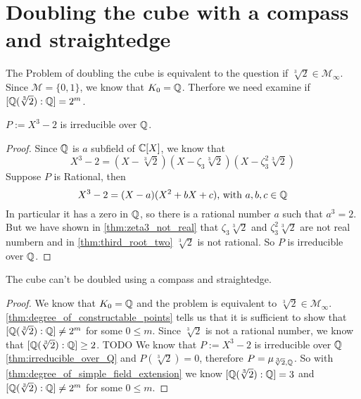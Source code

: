 \documentclass{../Proof_layout_PDF/TemplateExercise}
\begin{document}
\section{Doubling the cube with a compass and straightedge}
The Problem of doubling the cube is equivalent to the question if $\sqrt[3]{2} \in \mathcal{M}_{\infty}$.
Since $\mathcal{M} = \{0,1\}$, we know that $K_0 = \mathbb{Q}$. Therfore we need examine if $[\mathbb{Q}(\sqrt[3]{2}):\mathbb{Q}] = 2^m$.

\begin{theorem}
    $P := X^3 - 2$ is irreducible over $\mathbb{Q}$.
\label{thm:irreducible_over_Q}
\end{theorem}
\begin{proof}
    Since $\mathbb{Q}$ is $a$ subfield of $\mathbb{C} [X]$, we know that
    \begin{equation*}
        X^3 - 2 = (X - \sqrt[3]{2})(X -\zeta_3 \sqrt[3]{2})(X -\zeta_3^2 \sqrt[3]{2})
    \end{equation*}
    Suppose $P$ is Rational, then
    \begin{equation*}
        X^3 - 2 = (X - a)(X^2 + bX + c)\text{, with } a, b, c \in \mathbb{Q}
    \end{equation*}
    In particular it has a zero in $\mathbb{Q}$, so there is a rational number $a$ such that $a^3 = 2$.\newline
    But we have shown in \ref{thm:zeta3_not_real} that $\zeta_3 \sqrt[3]{2}$ and $\zeta_3^2 \sqrt[3]{2}$ are not real numbern and in \ref{thm:third_root_two} $\sqrt[3]{2}$ is not rational.
    So $P$ is irreducible over $\mathbb{Q}$.
\end{proof}
\begin{theorem}
    The cube can't be doubled using a compass and straightedge.
\end{theorem}
\begin{proof}
    We know that $K_0 = \mathbb{Q}$ and the problem is equivalent to $\sqrt[3]{2} \in \mathcal{M}_{\infty}$.\newline
    \ref{thm:degree_of_constructable_points} tells us that it is sufficient to show that $[\mathbb{Q}(\sqrt[3]{2}):\mathbb{Q}] \ne 2^m$ for some $0 \le m $.
    Since $\sqrt[3]{2}$ is not a rational number, we know that $[\mathbb{Q}(\sqrt[3]{2}):\mathbb{Q}] \ge 2$.
    TODO %
    \newline
    We know that $P := X^3 - 2$ is irreducible over $\mathbb{Q}$ \ref{thm:irreducible_over_Q} and $P(\sqrt[3]{2}) = 0$, therefore $P = \mu_{\sqrt[3]{2},\mathbb{Q}}$.
    So with \ref{thm:degree_of_simple_field_extension} we know $[\mathbb{Q}(\sqrt[3]{2}):\mathbb{Q}] = 3$ and $[\mathbb{Q}(\sqrt[3]{2}):\mathbb{Q}] \ne 2^m$ for some $0 \le m $.
\end{proof}
\end{document}
